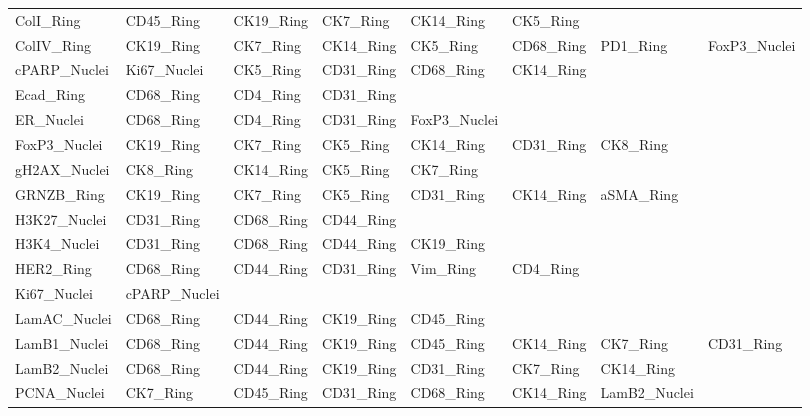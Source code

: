 \documentclass[preprint,review,3p,12pt]{elsarticle}
\begin{document}
\begin{supptable}[p]
{\begin{tabular}{l | l l l l l l l}
ColI\_Ring    & CD45\_Ring    & CK19\_Ring    & CK7\_Ring   & CK14\_Ring    & CK5\_Ring     &               &               \\
ColIV\_Ring   & CK19\_Ring    & CK7\_Ring     & CK14\_Ring  & CK5\_Ring     & CD68\_Ring    & PD1\_Ring     & FoxP3\_Nuclei \\
cPARP\_Nuclei & Ki67\_Nuclei  & CK5\_Ring     & CD31\_Ring  & CD68\_Ring    & CK14\_Ring    &               &               \\
Ecad\_Ring    & CD68\_Ring    & CD4\_Ring     & CD31\_Ring  &               &               &               &               \\
ER\_Nuclei    & CD68\_Ring    & CD4\_Ring     & CD31\_Ring  & FoxP3\_Nuclei &               &               &               \\
FoxP3\_Nuclei & CK19\_Ring    & CK7\_Ring     & CK5\_Ring   & CK14\_Ring    & CD31\_Ring    & CK8\_Ring     &               \\
gH2AX\_Nuclei & CK8\_Ring     & CK14\_Ring    & CK5\_Ring   & CK7\_Ring     &               &               &               \\
GRNZB\_Ring   & CK19\_Ring    & CK7\_Ring     & CK5\_Ring   & CD31\_Ring    & CK14\_Ring    & aSMA\_Ring    &               \\
H3K27\_Nuclei & CD31\_Ring    & CD68\_Ring    & CD44\_Ring  &               &               &               &               \\
H3K4\_Nuclei  & CD31\_Ring    & CD68\_Ring    & CD44\_Ring  & CK19\_Ring    &               &               &               \\
HER2\_Ring    & CD68\_Ring    & CD44\_Ring    & CD31\_Ring  & Vim\_Ring     & CD4\_Ring     &               &               \\
Ki67\_Nuclei  & cPARP\_Nuclei &               &             &               &               &               &               \\
LamAC\_Nuclei & CD68\_Ring    & CD44\_Ring    & CK19\_Ring  & CD45\_Ring    &               &               &               \\
LamB1\_Nuclei & CD68\_Ring    & CD44\_Ring    & CK19\_Ring  & CD45\_Ring    & CK14\_Ring    & CK7\_Ring     & CD31\_Ring    \\
LamB2\_Nuclei & CD68\_Ring    & CD44\_Ring    & CK19\_Ring  & CD31\_Ring    & CK7\_Ring     & CK14\_Ring    &               \\
PCNA\_Nuclei  & CK7\_Ring     & CD45\_Ring    & CD31\_Ring  & CD68\_Ring    & CK14\_Ring    & LamB2\_Nuclei &               \\

\end{tabular}}
\end{supptable}
\end{document}
